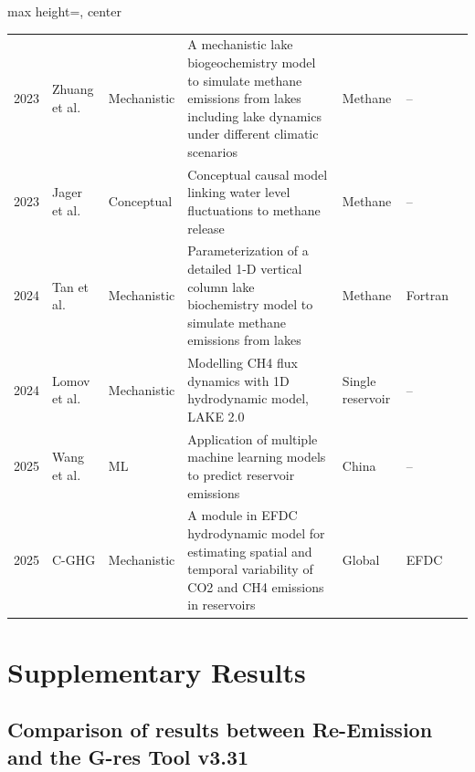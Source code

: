 \documentclass[10pt]{article}
\begin{document}
{\begin{table}
\begin{adjustbox}{max height=\textheight, center}
\begin{tabular}{p{0.03\textheight}p{0.11\textheight}p{0.07\textheight}p{0.48\textheight}p{0.10\textheight}p{0.09\textheight}p{0.12\textheight}}
2023 & Zhuang et al. & Mechanistic & A mechanistic lake biogeochemistry model to simulate methane emissions from lakes including lake dynamics under different climatic scenarios & Methane & -- & \citet{Zhuang2023} \\
2023 & Jager et al. & Conceptual & Conceptual causal model linking water level fluctuations to methane release & Methane & -- & \citet{Jager2023} \\
2024 & Tan et al. & Mechanistic & Parameterization of a detailed 1-D vertical column lake biochemistry model to simulate methane emissions from lakes & Methane & Fortran & \citet{Tan2024} \\
2024 & Lomov et al. & Mechanistic & Modelling \ac{CH4} flux dynamics with 1D hydrodynamic model, LAKE 2.0 & Single reservoir & -- & \citet{Lomov2024} \\
2025 & Wang et al. & ML & Application of multiple machine learning models to predict reservoir emissions & China & -- & \citet{WANG2025123441} \\
2025 & C-GHG & Mechanistic & A module in EFDC hydrodynamic model for estimating spatial and temporal variability of \ac{CO2} and \ac{CH4} emissions in reservoirs & Global & EFDC & \citet{SHI2025} \\
\bottomrule
\end{tabular}%
\end{adjustbox}
\end{table}
}

\section{Supplementary Results}
\label{supp-sec:supplementary_results}

\subsection{Comparison of results between Re-Emission and the G-res Tool v3.31}
\end{document}
